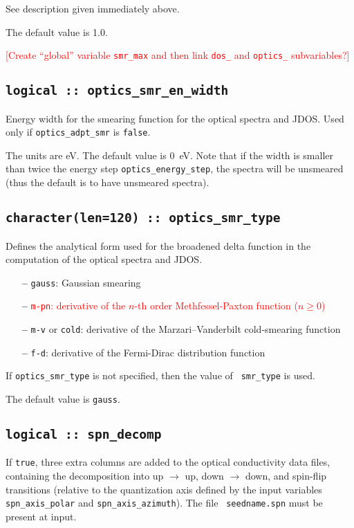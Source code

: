 See description given immediately above.

The default value is 1.0.

\textcolor{red}{[Create ``global'' variable {\tt smr\_max} and then link
{\tt dos\_} and {\tt optics\_} subvariables?]}

\subsection[optics\_smr\_en\_width]{\tt logical :: optics\_smr\_en\_width}
Energy width for the smearing function for the optical spectra
and JDOS. Used only if {\tt optics\_adpt\_smr} is \verb#false#.

The units are eV. The default value is 0~eV. Note that if the width is
smaller than twice the energy step {\tt optics\_energy\_step}, the spectra
will be unsmeared (thus the default is to have unsmeared spectra).


\subsection[optics\_smr\_type]{\tt  character(len=120) :: optics\_smr\_type}

Defines the analytical form used for the broadened delta function in
the computation of the optical spectra and JDOS.

\begin{itemize}
  
\item[{\bf --}]
  {\tt gauss}: Gaussian smearing

\item[{\bf --}]
  \textcolor{red}{{\tt m-pn}: derivative of the $n$-th order
    Methfessel-Paxton function ($n\geq 0$)}

\item[{\bf --}]
  {\tt m-v} or {\tt cold}: derivative of the Marzari--Vanderbilt cold-smearing function

\item[{\bf --}]
  {\tt f-d}: derivative of the Fermi-Dirac distribution function

\end{itemize}

If {\tt optics\_smr\_type} is not specified, then the value of {\tt
  smr\_type} is used.  

The default value is {\tt gauss}.

\subsection[spn\_decomp]{\tt logical :: spn\_decomp}
If {\tt true}, three extra columns are added to the optical
conductivity data files, containing the decomposition into up
$\rightarrow$ up, down $\rightarrow$ down, and spin-flip transitions
(relative to the quantization axis defined by the input variables {\tt
  spn\_axis\_polar} and {\tt spn\_axis\_azimuth}). The file {\tt
  seedname.spn} must be present at input.

